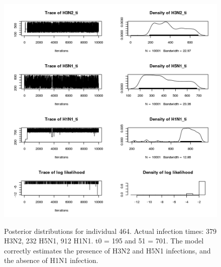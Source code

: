 \documentclass[a4paper,11pt,twoside]{article}
\begin{document}
\begin{figure}[H]
\begin{centering}
\includegraphics[scale=0.8]{464_mcmc.png}\\
\caption{Posterior distributions for individual 464. Actual infection times: 379 H3N2, 232 H5N1, 912 H1N1. t0 = 195 and 51 = 701. The model correctly estimates the presence of H3N2 and H5N1 infections, and the absence of H1N1 infection.}
\end{centering}
\end{figure}
\end{document}
